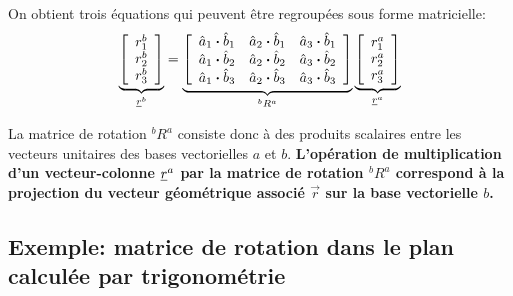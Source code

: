 On obtient trois équations qui peuvent être regroupées sous forme matricielle:
\begin{align}
	\underbrace{ \left[ \begin{array}{c} r_1^b \\ r_2^b \\ r_3^b  \end{array} \right] }_{\underline{r}^b}
	=
	\underbrace{ \left[ \begin{array}{c c c}
							\hat{a}_1 \boldsymbol{\cdot} \hat{b}_1 & \hat{a}_2 \boldsymbol{\cdot} \hat{b}_1 & \hat{a}_3 \boldsymbol{\cdot} \hat{b}_1 \\
							\hat{a}_1 \boldsymbol{\cdot} \hat{b}_2 & \hat{a}_2 \boldsymbol{\cdot} \hat{b}_2 & \hat{a}_3 \boldsymbol{\cdot} \hat{b}_2 \\
							\hat{a}_1 \boldsymbol{\cdot} \hat{b}_3 & \hat{a}_2 \boldsymbol{\cdot} \hat{b}_3 & \hat{a}_3 \boldsymbol{\cdot} \hat{b}_3
	\end{array} \right] }_{^bR^a}
	\underbrace{ \left[ \begin{array}{c} r_1^a \\ r_2^a \\ r_3^a  \end{array} \right] }_{\underline{r}^a}
	\label{eq:Rdot}
\end{align}

La matrice de rotation $^bR^a$ consiste donc à des produits scalaires entre les vecteurs unitaires des bases vectorielles $a$ et $b$. \textbf{L'opération de multiplication d'un vecteur-colonne $\underline{r}^a$ par la matrice de rotation $^bR^a$ correspond à la projection du vecteur géométrique associé $\vec{r}$ sur la base vectorielle $b$.}



\subsection{Exemple: matrice de rotation dans le plan calculée par trigonométrie}

